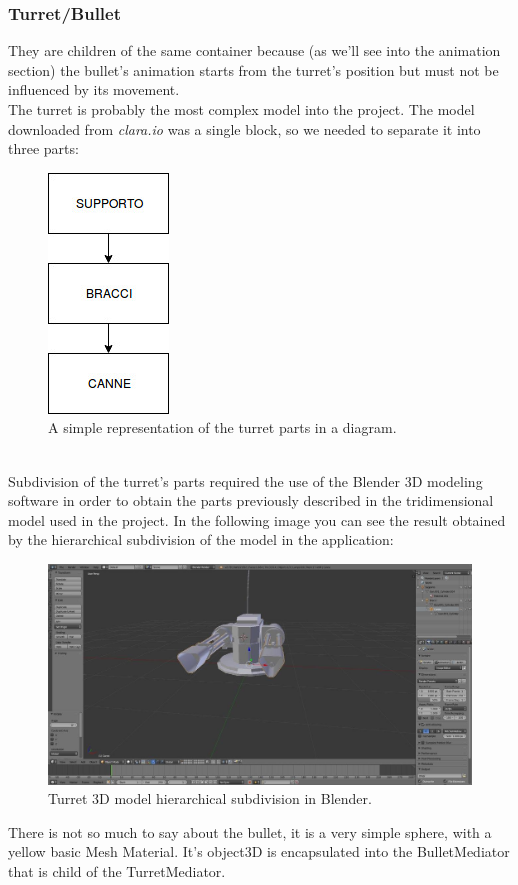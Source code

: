 \subsubsection{Turret/Bullet}
They are children of the same container because (as we'll see into the animation section) the bullet's animation starts from the turret's position but must not be influenced by its movement.\\
The turret is probably the most complex model into the project. The model downloaded from \textit{clara.io} was a single block, so we needed to separate it into three parts:
\begin{figure}[h!]
\begin{center}
\includegraphics[scale=0.5]{images/turret-diagram.jpg}
\caption{A simple representation of the turret parts in a diagram.}
\end{center}
\end{figure}\\
Subdivision of the turret's parts required the use of the Blender 3D modeling software in order to obtain the parts previously described in the  tridimensional model used in the project. In the following image you can see the result obtained by the hierarchical subdivision of the model in the application:
\begin{figure}[h!]
\begin{center}
\includegraphics[scale=0.35]{images/turret-blender.jpg}
\caption{Turret 3D model hierarchical subdivision in Blender.}
\end{center}
\end{figure}
There is not so much to say about the bullet, it is a very simple sphere, with a yellow basic Mesh Material. It's object3D is encapsulated into the BulletMediator that is child of the TurretMediator.
